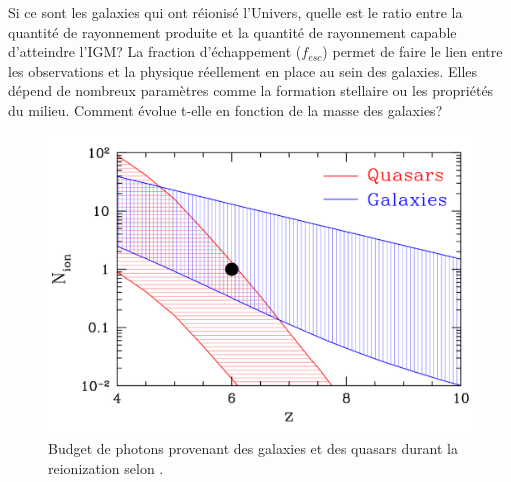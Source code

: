 Si ce sont les galaxies qui ont réionisé l'Univers, quelle est le ratio entre la quantité de rayonnement produite et la quantité de rayonnement capable d'atteindre l'\ac{IGM}?
La fraction d'échappement ($f_{esc}$) permet de faire le lien entre les observations et la physique réellement en place au sein des galaxies.
Elles dépend de nombreux paramètres comme la formation stellaire ou les propriétés du milieu.
Comment évolue t-elle en fonction de la masse des galaxies? 

\begin{figure}
        \includegraphics[width=.9\linewidth]{img/01/gal_AGN.pdf} 
        \caption{Budget de photons provenant des galaxies et des quasars durant la reionization selon \cite{trac_computer_2011}.
 		\label{fig:gal_AGN} }
\end{figure}



